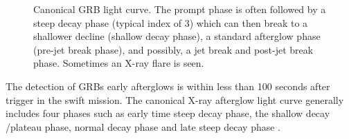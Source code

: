 \begin{figure}[hpbt]
\caption{Canonical GRB light curve. The prompt phase is often followed by a steep
decay phase (typical index of 3) which can then break to a shallower decline (shallow decay phase), a standard afterglow phase (pre-jet break phase), and possibly, a jet break and post-jet break phase. Sometimes an X-ray flare is seen.}
\label{Fg: Theoritical interpretation of X-ray afterglow}
\end{figure}
The detection of GRBs early afterglows is within less than 100 seconds after trigger
in the swift mission. The canonical X-ray afterglow light curve generally includes
four phases such as early time steep decay phase, the shallow decay /plateau
phase, normal decay phase and late steep decay phase \citep{33}.\\\\

